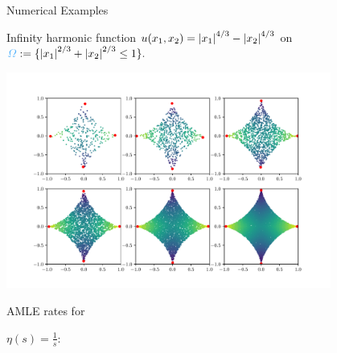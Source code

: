 %
\hfill%
%
\begin{minipage}[b][\midHeight][t]{.31\textwidth}%
{\color{BaseDarkColor} Numerical Examples}\\
\begin{minipage}{.5\textwidth}%
\small%
Infinity harmonic function $u(x_1,x_2)=\left|x_1\right|^{4/3}-\left|x_2\right|^{4/3}$ on $\domain:=\{\abs{x_1}^{2/3}+\abs{x_2}^{2/3}\leq 1\}.$
\end{minipage}%
\begin{minipage}{.5\textwidth}%
\centering
{\includegraphics[width=0.8\textwidth,trim=1.8cm 1.1cm 1.8cm 1.4cm,clip]{atelier/neumann_star_solution}}%
\end{minipage}%
%
%
\vspace{.5em}

\begin{minipage}{.32\textwidth}%
\small
AMLE rates for \hfill

$\eta(s)=\tfrac{1}{s}$:


\end{minipage}
\end{minipage}
